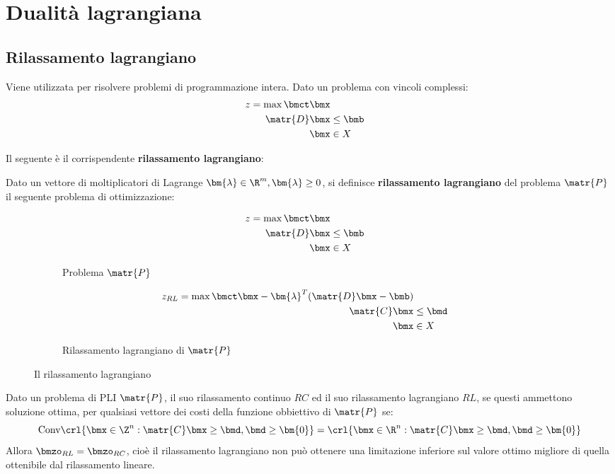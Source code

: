 \documentclass[\main/main.tex]{subfiles}
\begin{document}
\chapter{Dualità lagrangiana}
\section{Rilassamento lagrangiano}
Viene utilizzata per risolvere problemi di programmazione intera. Dato un problema con vincoli complessi:
\begin{align*}
    z = \max \bmct\bmx \\
    \matr{D}\bmx &\leq \bmb \\
    \bmx &\in X
\end{align*}

Il seguente è il corrispendente \textbf{rilassamento lagrangiano}:

\begin{definition}
    Dato un vettore di moltiplicatori di Lagrange \(\bm{\lambda} \in \R^m, \bm{\lambda}\geq 0\), si definisce \textbf{rilassamento lagrangiano} del problema \(\matr{P}\) il seguente problema di ottimizzazione:
    \begin{figure}
        \begin{subfigure}{0.49\textwidth}
            \begin{align*}
                z = \max \bmct\bmx \\
                \matr{D}\bmx &\leq \bmb \\
                \bmx &\in X
            \end{align*}
            \caption{Problema \(\matr{P}\)}
        \end{subfigure}
        \begin{subfigure}{0.49\textwidth}
            \begin{align*}
                z_{RL} = \max \bmct\bmx - \bm{\lambda}^T(\matr{D}\bmx-\bmb) \\
                \matr{C}\bmx &\leq \bmd \\
                \bmx &\in X
            \end{align*}
            \caption{Rilassamento lagrangiano di \(\matr{P}\)}
        \end{subfigure}
        \caption{Il rilassamento lagrangiano}
    \end{figure}
\end{definition}

\begin{theorem}
    Dato un problema di PLI \(\matr{P}\), il suo rilassamento continuo \(RC\) ed il suo rilassamento lagrangiano \(RL\), se questi ammettono soluzione ottima, per qualsiasi vettore dei costi della funzione obbiettivo di \(\matr{P}\) se:
    \[
        \text{Conv}\crl{\bmx \in \Z^n: \matr{C}\bmx \geq \bmd, \bmd \geq \bm{0}} = \crl{\bmx \in \R^n: \matr{C}\bmx \geq \bmd, \bmd \geq \bm{0}}
    \]    Allora \(\bmzo_{RL} = \bmzo_{RC}\), cioè il rilassamento lagrangiano non può ottenere una limitazione inferiore sul valore ottimo migliore di quella ottenibile dal rilassamento lineare.
\end{theorem}
\end{document}
